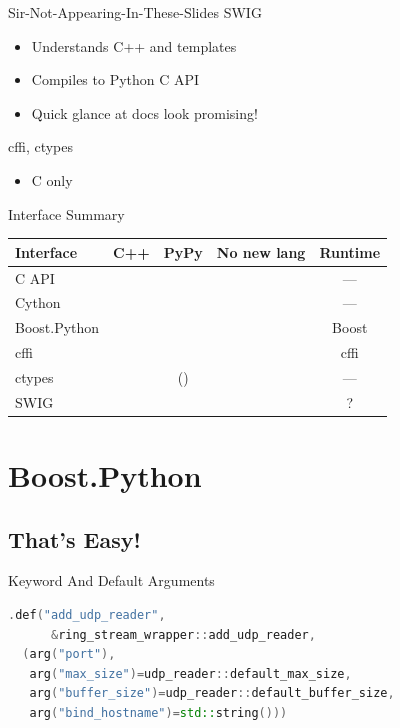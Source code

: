 \documentclass{beamer}
\begin{document}
\begin{frame}{Sir-Not-Appearing-In-These-Slides}
  SWIG
  \begin{itemize}
    \item Understands C++ and templates
    \item Compiles to Python C API
    \item Quick glance at docs look promising!
  \end{itemize}
  cffi, ctypes
  \begin{itemize}
    \item C only
  \end{itemize}
\end{frame}

\begin{frame}{Interface Summary}
  \def\yes{\textcolor{green!50!black}{\CheckmarkBold}}
  \def\no{\textcolor{red}{\XSolidBrush}}
  \begin{table}
    \begin{tabular}{lcccc}
      \toprule
      Interface & C++ & PyPy & No new lang & Runtime\\
      \midrule
      C API & \no & \no & \yes & ---\\
      Cython & \yes & \no & \no & ---\\
      Boost.Python & \yes & \no & \yes & Boost\\
      cffi  & \no & \yes & \yes & cffi\\
      ctypes & \no & (\yes) & \yes & ---\\
      SWIG & \yes & \no & \no & ?\\
      \bottomrule
    \end{tabular}
  \end{table}
\end{frame}

\section{Boost.Python}

\subsection{That's Easy!}

\begin{frame}[fragile=singleslide]{Keyword And Default Arguments}
  \begin{lstlisting}[language=c++]
.def("add_udp_reader",
      &ring_stream_wrapper::add_udp_reader,
  (arg("port"),
   arg("max_size")=udp_reader::default_max_size,
   arg("buffer_size")=udp_reader::default_buffer_size,
   arg("bind_hostname")=std::string()))
  \end{lstlisting}
\end{frame}
\end{document}
